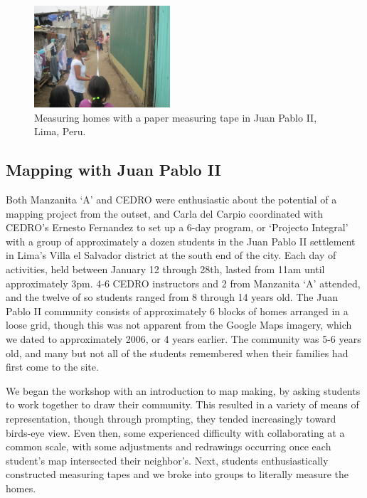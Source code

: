 \documentclass[11pt,oneside,notitlepage]{report}
\begin{document}
\begin{figure}
	\begin{flushright}
		\includegraphics[width=0.45\textwidth]{images/juan-pablo-measuring.jpg}
		\caption{Measuring homes with a paper measuring tape in Juan Pablo II, Lima, Peru.}
	\end{flushright}
\end{figure}

\subsection{Mapping with Juan Pablo II}

Both Manzanita `A' and CEDRO were enthusiastic about the potential of a mapping project from the outset, and Carla del Carpio coordinated with CEDRO's Ernesto Fernandez to set up a 6-day program, or `Projecto Integral' with a group of approximately a dozen students in the Juan Pablo II settlement in Lima's Villa el Salvador district at the south end of the city. Each day of activities, held between January 12 through 28th, lasted from 11am until approximately 3pm. 4-6 CEDRO instructors and 2 from Manzanita `A' attended, and the twelve of so students ranged from 8 through 14 years old. The Juan Pablo II community consists of approximately 6 blocks of homes arranged in a loose grid, though this was not apparent from the Google Maps imagery, which we dated to approximately 2006, or 4 years earlier. The community was 5-6 years old, and many but not all of the students remembered when their families had first come to the site. 

We began the workshop with an introduction to map making, by asking students to work together to draw their community. This resulted in a variety of means of representation, though through prompting, they tended increasingly toward birds-eye view. Even then, some experienced difficulty with collaborating at a common scale, with some adjustments and redrawings occurring once each student's map intersected their neighbor's. Next, students enthusiastically constructed measuring tapes and we broke into groups to literally measure the homes. 
\end{document}
